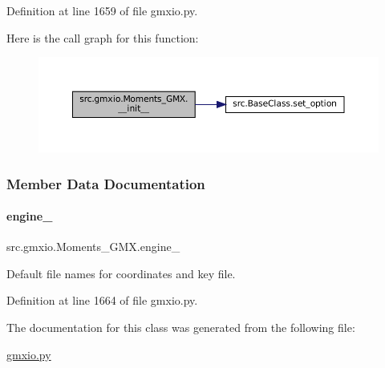 Definition at line 1659 of file gmxio.\+py.

Here is the call graph for this function\+:
\nopagebreak
\begin{figure}[H]
\begin{center}
\leavevmode
\includegraphics[width=350pt]{classsrc_1_1gmxio_1_1Moments__GMX_aa9e32792e45e50f3f860ce98b08f98b8_cgraph}
\end{center}
\end{figure}


\subsubsection{Member Data Documentation}
\mbox{\label{classsrc_1_1gmxio_1_1Moments__GMX_a725ad55ef0765b5b2c514558a28cb338}} 
\paragraph{\texorpdfstring{engine\+\_\+}{engine\_}}
{\footnotesize\ttfamily src.\+gmxio.\+Moments\+\_\+\+G\+M\+X.\+engine\+\_\+}



Default file names for coordinates and key file. 



Definition at line 1664 of file gmxio.\+py.



The documentation for this class was generated from the following file\+:\begin{DoxyCompactItemize}
\item 
\hyperlink{gmxio_8py}{gmxio.\+py}\end{DoxyCompactItemize}
